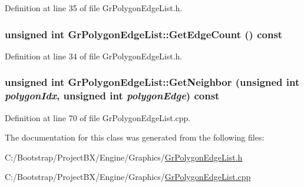 Definition at line 35 of file GrPolygonEdgeList.h.\hypertarget{class_gr_polygon_edge_list_cce9c1dcca74841f88e1b7193a39d20f}{
\subsubsection[{GetEdgeCount}]{\setlength{\rightskip}{0pt plus 5cm}unsigned int GrPolygonEdgeList::GetEdgeCount () const}}
\label{class_gr_polygon_edge_list_cce9c1dcca74841f88e1b7193a39d20f}




Definition at line 34 of file GrPolygonEdgeList.h.\hypertarget{class_gr_polygon_edge_list_f59bed99946b385a88a82f9a2e32812c}{
\subsubsection[{GetNeighbor}]{\setlength{\rightskip}{0pt plus 5cm}unsigned int GrPolygonEdgeList::GetNeighbor (unsigned int {\em polygonIdx}, \/  unsigned int {\em polygonEdge}) const}}
\label{class_gr_polygon_edge_list_f59bed99946b385a88a82f9a2e32812c}




Definition at line 70 of file GrPolygonEdgeList.cpp.

The documentation for this class was generated from the following files:\begin{CompactItemize}
\item 
C:/Bootstrap/ProjectBX/Engine/Graphics/\hyperlink{_gr_polygon_edge_list_8h}{GrPolygonEdgeList.h}\item 
C:/Bootstrap/ProjectBX/Engine/Graphics/\hyperlink{_gr_polygon_edge_list_8cpp}{GrPolygonEdgeList.cpp}\end{CompactItemize}

